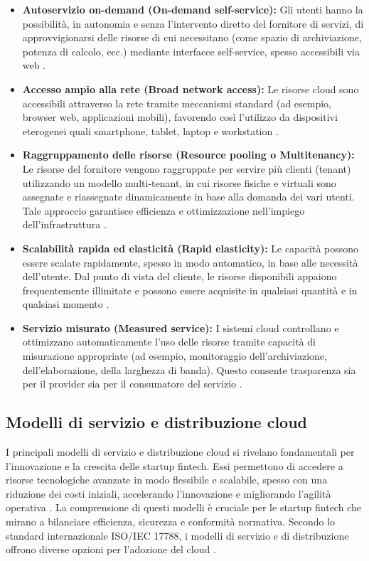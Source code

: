 \begin{itemize}
  \item \textbf{Autoservizio on-demand (On-demand self-service):} Gli utenti hanno la possibilità, in autonomia e senza l'intervento diretto del fornitore di servizi, di approvvigionarsi delle risorse di cui necessitano (come spazio di archiviazione, potenza di calcolo, ecc.) mediante interfacce self-service, spesso accessibili via web \cite{nist800-145}.

  \item \textbf{Accesso ampio alla rete (Broad network access):} Le risorse cloud sono accessibili attraverso la rete tramite meccanismi standard (ad esempio, browser web, applicazioni mobili), favorendo così l'utilizzo da dispositivi eterogenei quali smartphone, tablet, laptop e workstation \cite{nist800-145}.

  \item \textbf{Raggruppamento delle risorse (Resource pooling o Multitenancy):} Le risorse del fornitore vengono raggruppate per servire più clienti (tenant) utilizzando un modello multi-tenant, in cui risorse fisiche e virtuali sono assegnate e riassegnate dinamicamente in base alla domanda dei vari utenti. Tale approccio garantisce efficienza e ottimizzazione nell'impiego dell'infrastruttura \cite{nist800-145}.

  \item \textbf{Scalabilità rapida ed elasticità (Rapid elasticity):} Le capacità possono essere scalate rapidamente, spesso in modo automatico, in base alle necessità dell'utente. Dal punto di vista del cliente, le risorse disponibili appaiono frequentemente illimitate e possono essere acquisite in qualsiasi quantità e in qualsiasi momento \cite{nist800-145}.

  \item \textbf{Servizio misurato (Measured service):} I sistemi cloud controllano e ottimizzano automaticamente l'uso delle risorse tramite capacità di misurazione appropriate (ad esempio, monitoraggio dell'archiviazione, dell'elaborazione, della larghezza di banda). Questo consente trasparenza sia per il provider sia per il consumatore del servizio \cite{nist800-145}.
\end{itemize}

\subsection{Modelli di servizio e distribuzione cloud}

I principali modelli di servizio e distribuzione cloud si rivelano fondamentali per l'innovazione e la crescita delle startup fintech. Essi permettono di accedere a risorse tecnologiche avanzate in modo flessibile e scalabile, spesso con una riduzione dei costi iniziali, accelerando l'innovazione e migliorando l'agilità operativa \cite{vats2024systematic, hrmars2025cloud}.
La comprensione di questi modelli è cruciale per le startup fintech che mirano a bilanciare efficienza, sicurezza e conformità normativa. Secondo lo standard internazionale ISO/IEC 17788, i modelli di servizio e di distribuzione offrono diverse opzioni per l'adozione del cloud \cite{iso2018overview}.

